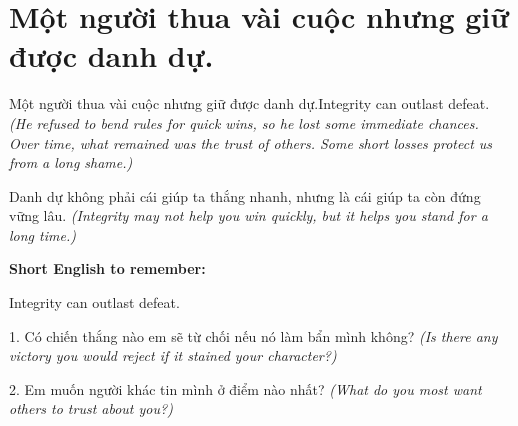 \section{Một người thua vài cuộc nhưng giữ được danh dự.}
\begin{truyen}{Một người thua vài cuộc nhưng giữ được danh dự.}{Integrity can outlast defeat.}
\textit{(He refused to bend rules for quick wins, so he lost some immediate chances. Over time, what remained was the trust of others. Some short losses protect us from a long shame.)}
\end{truyen}
\begin{baihoc}
Danh dự không phải cái giúp ta thắng nhanh, nhưng là cái giúp ta còn đứng vững lâu.
\textit{(Integrity may not help you win quickly, but it helps you stand for a long time.)}
\end{baihoc}
\begin{ghinhoanh}\textbf{Short English to remember:}

Integrity can outlast defeat.
\end{ghinhoanh}
\begin{tuhocnhanh}
1. Có chiến thắng nào em sẽ từ chối nếu nó làm bẩn mình không? \textit{(Is there any victory you would reject if it stained your character?)}

2. Em muốn người khác tin mình ở điểm nào nhất? \textit{(What do you most want others to trust about you?)}
\end{tuhocnhanh}
\ngancach

